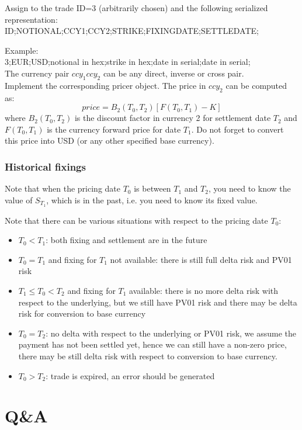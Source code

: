 \documentclass[10pt]{article}
\begin{document}
Assign to the trade ID=3 (arbitrarily chosen) and the following serialized representation:\\
ID;NOTIONAL;CCY1;CCY2;STRIKE;FIXINGDATE;SETTLEDATE;

\noindent Example:\\
3;EUR;USD;notional in hex;strike in hex;date in serial;date in serial;\\

The currency pair $ccy_1ccy_2$ can be any direct, inverse or cross pair.\\

Implement the corresponding pricer object. The price in $ccy_2$ can be computed as:
$$
price=B_2(T_0, T_2)[F(T_0,T_1)-K]
$$
where $B_2(T_0,T_2)$ is the discount factor in currency 2 for settlement date $T_2$ and $F(T_0,T_1)$ is the currency forward price for date $T_1$. Do not forget to convert this price into USD (or any other specified base currency).

\subsubsection{Historical fixings}
Note that when the pricing date $T_0$ is between $T_1$ and $T_2$, you need to know the value of $S_{T_1}$, which is in the past, i.e. you need to know its fixed value. 

Note that there can be various situations with respect to the pricing date $T_0$:
\begin{itemize}
	\item $T_0< T_1$: both fixing and settlement are in the future
	\item $T_0 = T_1$ and fixing for $T_1$ not available: there is still full delta risk and PV01 risk
	\item $ T_1 \leq T_0 < T_2$ and fixing for $T_1$ available: there is no more delta risk with respect to the underlying, but we still have PV01 risk and there may be delta risk for conversion to base currency
	\item $T_0 = T_2$: no delta with respect to the underlying or PV01 risk, we assume the payment has not been settled yet, hence we can still have a non-zero price, there may be still delta risk with respect to conversion to base currency.
	\item $T_0 > T_2$: trade is expired, an error should be generated
\end{itemize}

\section{Q\&A}
\end{document}
